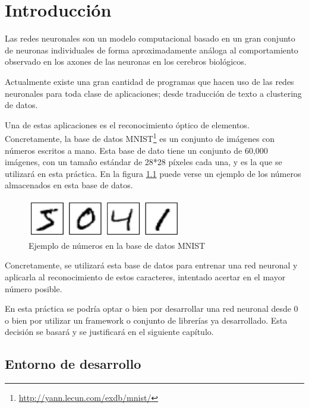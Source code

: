 \chapter{Introducción}

Las redes neuronales son un modelo computacional basado en un gran conjunto de neuronas individuales de forma aproximadamente análoga al comportamiento observado en los axones de las neuronas en los cerebros biológicos.

\bigskip

Actualmente existe una gran cantidad de programas que hacen uso de las redes neuronales para toda clase de aplicaciones; desde traducción de texto a clustering de datos.

\bigskip

Una de estas aplicaciones es el reconocimiento óptico de elementos. Concretamente, la base de datos MNIST\footnote{\url{http://yann.lecun.com/exdb/mnist/}} es un conjunto de imágenes con números escritos a mano. Esta base de dato tiene un conjunto de 60,000 imágenes, con un tamaño estándar de 28*28 píxeles cada una, y es la que se utilizará en esta práctica. En la figura \ref{fig:mnist-numbers} puede verse un ejemplo de los números almacenados en esta base de datos.

\bigskip

\begin{figure}[H]
  \centering
  \includegraphics[width=0.6\textwidth]{../images/mnist-numbers}
  \caption{Ejemplo de números en la base de datos MNIST}
  \label{fig:mnist-numbers}
\end{figure}

\bigskip

Concretamente, se utilizará esta base de datos para entrenar una red neuronal y aplicarla al reconocimiento de estos caracteres, intentado acertar en el mayor número posible.

\bigskip

En esta práctica se podría optar o bien por desarrollar una red neuronal desde 0 o bien por utilizar un framework o conjunto de librerías ya desarrollado. Esta decisión se basará y se justificará en el siguiente capítulo.

\bigskip

\section{Entorno de desarrollo}

